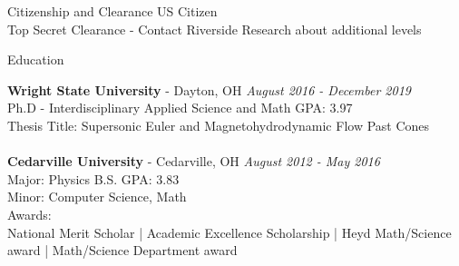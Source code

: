 \documentclass{resume} %
\begin{document}
\begin{rSection}{Citizenship and Clearance}
US Citizen
\\Top Secret Clearance - Contact Riverside Research about additional levels

\end{rSection}


\begin{rSection}{Education}

{\bf Wright State University} - Dayton, OH \hfill {\em August 2016 - December 2019} 
\\ Ph.D - Interdisciplinary Applied Science and Math \hfill {GPA: 3.97}
\\ Thesis Title: Supersonic Euler and Magnetohydrodynamic Flow Past Cones\\
\\{\bf Cedarville University} - Cedarville, OH \hfill {\em August 2012 - May 2016} 
\\ Major: Physics B.S. \hfill { GPA: 3.83 }
\\ Minor: Computer Science, Math \smallskip \\
Awards: \\ National Merit Scholar | Academic Excellence Scholarship | Heyd Math/Science award | Math/Science Department award



\end{rSection}
\end{document}
